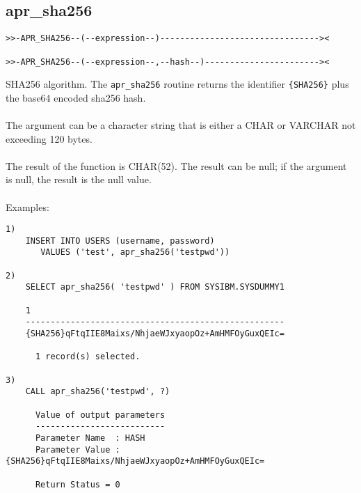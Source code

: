 \subsection{apr\_sha256} \label{aprsha256}
\begin{verbatim}
>>-APR_SHA256--(--expression--)--------------------------------><

>>-APR_SHA256--(--expression--,--hash--)-----------------------><
\end{verbatim}
SHA256 algorithm. The {\tt apr\_sha256} routine returns the identifier {\tt \{SHA256\}} plus the base64 encoded sha256 hash.\\
\\
The argument can be a character string that is either a \mbox{CHAR} or \mbox{VARCHAR} not exceeding 120 bytes.\\
\\
The result of the function is CHAR(52). The result can be null; if the argument is null, the result is the null value.\\
\\
Examples:
\begin{verbatim}
1)
    INSERT INTO USERS (username, password)
       VALUES ('test', apr_sha256('testpwd'))

2)
    SELECT apr_sha256( 'testpwd' ) FROM SYSIBM.SYSDUMMY1

    1
    ----------------------------------------------------
    {SHA256}qFtqIIE8Maixs/NhjaeWJxyaopOz+AmHMFOyGuxQEIc=

      1 record(s) selected.

3)
    CALL apr_sha256('testpwd', ?)

      Value of output parameters
      --------------------------
      Parameter Name  : HASH
      Parameter Value : {SHA256}qFtqIIE8Maixs/NhjaeWJxyaopOz+AmHMFOyGuxQEIc=

      Return Status = 0
\end{verbatim}
\newpage
\hypertarget{hvalidatepw}{}
